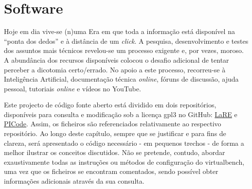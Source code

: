 \begin{table}[htb]
	\centering
	\caption{Exemplo funcionamento do rectificador de meia onda} 
	\label{Table:rectificadoresfiltros}
\end{table}

\section{Software}
\label{sec:implementacaosoftware}
Hoje em dia vive-se (n)uma Era em que toda a informação está disponível na ``ponta dos dedos'' e à distância de um \textit{click}. A pesquisa, desenvolvimento e testes dos assuntos mais técnicos revelou-se um processo exigente e, por vezes, moroso. A abundância dos recursos disponíveis colocou o desafio adicional de tentar perceber a dicotomia certo/errado. No apoio a este processo, recorreu-se à Inteligência Artificial, documentação técnica \textit{online}, fóruns de discussão, ajuda pessoal, tutoriais \textit{online} e vídeos no YouTube.

Este projecto de código fonte aberto está dividido em dois repositórios, disponíveis para consulta e modificação sob a licença \acrfull{gpl3} no GitHub: \href{https://github.com/eddygrinder/LaRE}{LaRE} e \href{https://github.com/eddygrinder/LaRE_PICode}{PICode}. Assim, os ficheiros são referenciados relativamente ao respectivo repositório. Ao longo deste capítulo, sempre que se justificar e para fins de clareza, será apresentado o código necessário - em pequenos trechos - de forma a melhor ilustrar os conceitos discutidos. Não se pretende, contudo, abordar exaustivamente todas as instruções ou métodos de configuração do \acrshort{virtualbench}, uma vez que os ficheiros se encontram comentados, sendo possível obter informações adicionais através da sua consulta. 

